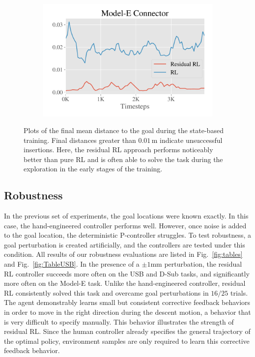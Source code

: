 \begin{figure}[tbp]
{\begin{subfigure}[b]{0.32\linewidth}
    \end{subfigure}
    \begin{subfigure}[b]{0.32\linewidth}
        \includegraphics[width=0.99\linewidth]{insertion/newfigs/Waterproof_state_distance.pdf}
    \end{subfigure}
    }
    \caption{Plots of the final mean distance to the goal during the state-based training. Final distances greater than $0.01\,\mathrm{m}$ indicate unsuccessful insertions. Here, the residual RL approach performs noticeably better than pure RL and is often able to solve the task during the exploration in the early stages of the training.}
    \label{fig:state_based_distance_all}
\end{figure}

\subsection{Robustness}

In the previous set of experiments, the goal locations were known exactly.
In this case, the hand-engineered controller
performs well. However, once
noise is added to the goal location, the deterministic P-controller struggles. 
To test robustness, a goal perturbation is created artificially, and the controllers are tested under this condition. 
All results of our robustness evaluations are listed in Fig.~\ref{fig:tables} and Fig.~\ref{fig:TableUSB}.  
In the presence of a $\pm 1\mathrm{mm}$ perturbation, the
residual RL 
controller succeeds more often on the USB and D-Sub tasks, and significantly more often on the Model-E task.
Unlike the hand-engineered controller, residual RL consistently solved this task and overcame goal perturbations in $16/25$ trials. 
The agent demonstrably learns small but consistent corrective
feedback behaviors in order to move in
the right direction during the descent motion, a behavior that
is very difficult to specify manually.
This behavior illustrates the strength of
residual RL. Since the human controller already specifies the general
trajectory of the optimal policy, environment samples are only
required to learn this corrective feedback behavior.

